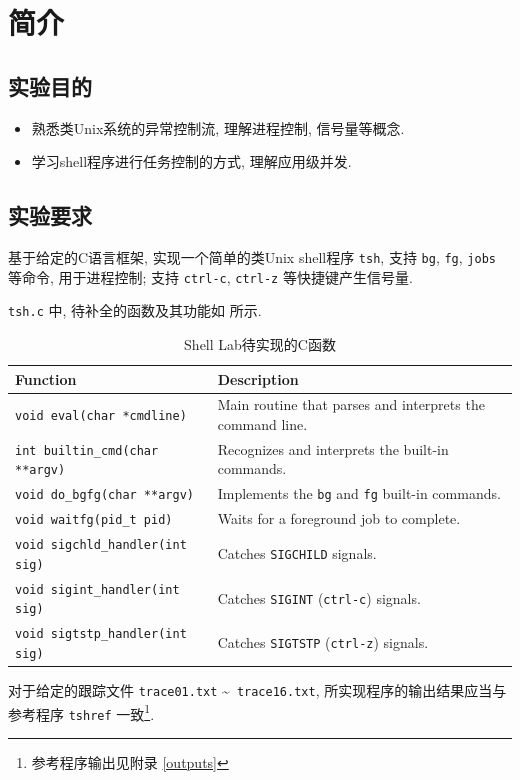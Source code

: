 
\section{简介}

\subsection{实验目的}

\begin{itemize}[noitemsep]
    \item 熟悉类Unix系统的异常控制流, 理解进程控制, 信号量等概念.
    \item 学习shell程序进行任务控制的方式, 理解应用级并发.
\end{itemize}

\subsection{实验要求}

基于给定的C语言框架, 实现一个简单的类Unix shell程序 \verb|tsh|, 支持 \verb|bg|, \verb|fg|, \verb|jobs| 等命令, 用于进程控制; 支持 \verb|ctrl-c|, \verb|ctrl-z| 等快捷键产生信号量.

\verb|tsh.c| 中, 待补全的函数及其功能如 所示.
\begin{table}[H]
    \small
    \centering
    \begin{tabular}{ll}
        \toprule
        Function & Description \\
        \midrule
        \verb|void eval(char *cmdline)| & Main routine that parses and interprets the command line. \\
        \verb|int builtin_cmd(char **argv)| & Recognizes and interprets the built-in commands. \\
        \verb|void do_bgfg(char **argv)| & Implements the \verb|bg| and \verb|fg| built-in commands. \\
        \verb|void waitfg(pid_t pid)| & Waits for a foreground job to complete. \\
        \verb|void sigchld_handler(int sig)| & Catches \verb|SIGCHILD| signals. \\
        \verb|void sigint_handler(int sig)| & Catches \verb|SIGINT| (\verb|ctrl-c|) signals. \\
        \verb|void sigtstp_handler(int sig)| & Catches \verb|SIGTSTP| (\verb|ctrl-z|) signals. \\
        \bottomrule
    \end{tabular}
    \caption{Shell Lab待实现的C函数}\label{functions}
\end{table}
对于给定的跟踪文件 \verb|trace01.txt| \textasciitilde\ \verb|trace16.txt|, 所实现程序的输出结果应当与参考程序 \verb|tshref| 一致\footnote{参考程序输出见附录 \ref{outputs} }.

